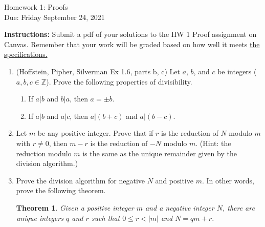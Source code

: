 \documentclass[12pt]{article}
\newcommand{\Z}{\mathbb{Z}}
\newtheorem*{theorem}{Theorem}
\begin{document}
\begin{center}
{\Large Homework 1: Proofs}\\
Due: Friday September 24, 2021\\


\end{center}
{\bf Instructions:} Submit a pdf of your solutions to the HW 1 Proof assignment on Canvas. Remember that your work will be graded based on how well it meets \href{https://docs.google.com/document/d/1emM06_WRh_h941rsjtRE9fRVndJtfRKd9gyS3Fs_rFA/edit?usp=sharing}{the specifications. }

\begin{enumerate}


\item (Hoffstein, Pipher, Silverman Ex 1.6, parts b, c) Let $a$, $b$, and $c$ be integers ($a,b,c\in \Z$). Prove the following properties of divisibility.
\begin{enumerate}
\item If $a|b$ and $b|a$, then $a=\pm b$.
\item If $a|b$ and $a|c$, then $a|(b+c)$ and $a|(b-c)$. 
\end{enumerate} 
\item Let $m$ be any positive integer. Prove that  if $r$ is the reduction of $N$ modulo $m$ with $r\ne 0$, then $m-r$ is the reduction of $-N$ modulo $m$. (Hint: the reduction modulo $m$ is the same as the unique remainder given by the division algorithm.)
\item Prove the division algorithm for negative $N$ and positive $m$.  In other words, prove the following theorem. 
\begin{theorem}
Given a positive integer $m$ and a negative integer $N$, there are unique integers $q$ and $r$ such that $0\le r<|m|$ and $N=qm+r$. 
\end{theorem}
\end{enumerate}
\end{document}
